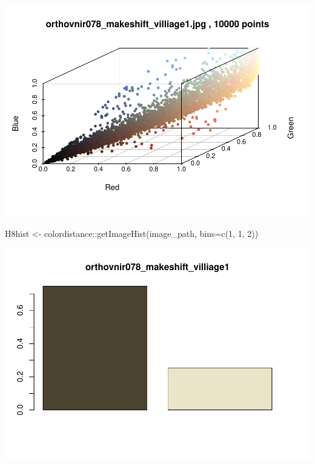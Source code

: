 \documentclass[
]{article}
\newenvironment{Shaded}{\begin{snugshade}}{\end{snugshade}}
\newcommand{\AttributeTok}[1]{\textcolor[rgb]{0.77,0.63,0.00}{#1}}
\newcommand{\DecValTok}[1]{\textcolor[rgb]{0.00,0.00,0.81}{#1}}
\newcommand{\FunctionTok}[1]{\textcolor[rgb]{0.00,0.00,0.00}{#1}}
\newcommand{\NormalTok}[1]{#1}
\newcommand{\OtherTok}[1]{\textcolor[rgb]{0.56,0.35,0.01}{#1}}
\newcommand{\SpecialCharTok}[1]{\textcolor[rgb]{0.00,0.00,0.00}{#1}}
\begin{document}
\begin{center}\includegraphics{ProjectPart1_MERGED_files/figure-latex/makeshift village-1} \end{center}

\begin{Shaded}
\begin{Highlighting}[]
\NormalTok{H8hist }\OtherTok{\textless{}{-}}\NormalTok{ colordistance}\SpecialCharTok{::}\FunctionTok{getImageHist}\NormalTok{(image\_path, }\AttributeTok{bins=}\FunctionTok{c}\NormalTok{(}\DecValTok{1}\NormalTok{, }\DecValTok{1}\NormalTok{, }\DecValTok{2}\NormalTok{))}
\end{Highlighting}
\end{Shaded}

\begin{center}\includegraphics{ProjectPart1_MERGED_files/figure-latex/makeshift village-2} \end{center}
\end{document}
